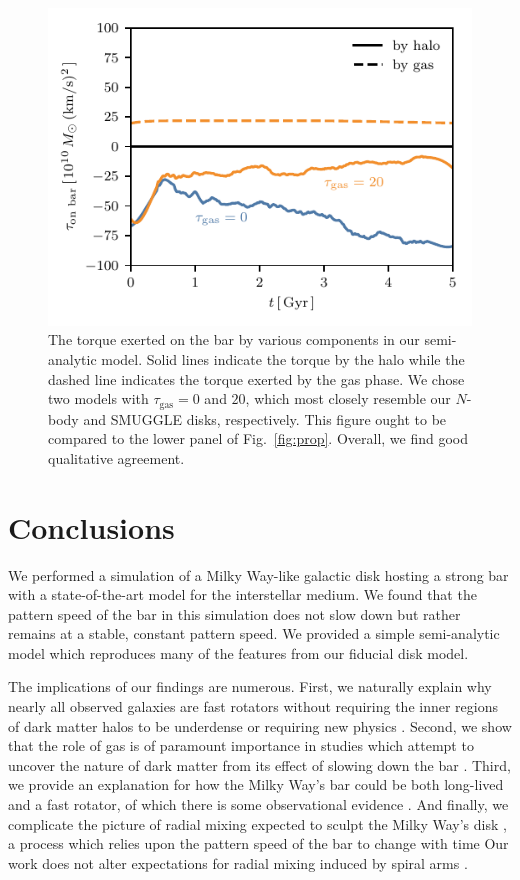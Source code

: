 \documentclass[fleqn,usenatbib]{mnras}
\begin{document}
\begin{figure}
    \centering
    \includegraphics[width=\columnwidth]{fig/sam_torque.pdf}
    \caption{The torque exerted on the bar by various components in our
    semi-analytic model. Solid lines indicate the torque by the halo while the
    dashed line indicates the torque exerted by the gas phase. We chose two
    models with $\tau_{\textrm{gas}}=0$ and $20$, which most closely resemble
    our $N$-body and SMUGGLE disks, respectively. This figure ought to be
    compared to the lower panel of Fig.~\ref{fig:prop}. Overall, we find good
    qualitative agreement.}
    \label{fig:sam-torque}
\end{figure}

\section{Conclusions}
\label{sec:conclusions}
We performed a simulation of a Milky Way-like galactic disk hosting a strong bar
with a state-of-the-art model for the interstellar medium. We found that the
pattern speed of the bar in this simulation does not slow down but rather
remains at a stable, constant pattern speed. We provided a simple semi-analytic
model which reproduces many of the features from our fiducial disk model.

The implications of our findings are numerous. First, we naturally explain why
nearly all observed galaxies are fast rotators without requiring the inner
regions of dark matter halos to be underdense \citep{1998ApJ...493L...5D,
2000ApJ...543..704D} or requiring new physics \citep{2021MNRAS.503.2833R,
2021MNRAS.508..926R}. Second, we show that the role of gas is of paramount
importance in studies which attempt to uncover the nature of dark matter from
its effect of slowing down the bar \citep{2021MNRAS.500.4710C,
2021MNRAS.505.2412C}. Third, we provide an explanation for how the Milky Way's
bar could be both long-lived and a fast rotator, of which there is some
observational evidence \citep{2019MNRAS.490.4740B}. And finally, we complicate
the picture of radial mixing expected to sculpt the Milky Way's disk
\citep{2012MNRAS.420..913B, 2015ApJ...808..132H}, a process which relies upon
the pattern speed of the bar to change with time Our work does not alter
expectations for radial mixing induced by spiral arms
\citep{2002MNRAS.336..785S}.
\end{document}
